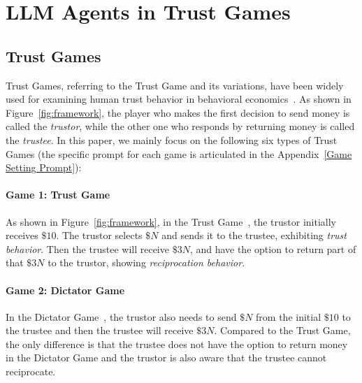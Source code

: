 \vspace{-0.4cm}
\section{LLM Agents in Trust Games}
\vspace{-0.15cm}


\subsection{Trust Games}


Trust Games, referring to the Trust Game and its variations, have been widely used for examining human trust behavior in behavioral economics~\citep{berg1995trust,lentonIncentivisingTrust2011,Measuring_Trust,cesariniHeritabilityCooperativeBehavior2008}.
As shown in Figure~\ref{fig:framework}, the player who makes the first decision to send money is called the \textit{trustor}, while the other one who responds by returning money is called the \textit{trustee}. 
In this paper, we mainly focus on the following six types of Trust Games (the specific prompt for each game is articulated in the Appendix~\ref{Game Setting Prompt}):









\vspace{-3mm}
\paragraph{Game 1: Trust Game}
\label{game:Trustee trust rate Game}

 As shown in Figure~\ref{fig:framework}, in the Trust Game~\citep{coxHowIdentifyTrust2004b,berg1995trust}, the trustor initially receives $\$10$. The trustor selects $\$N$ and sends it to the trustee, exhibiting  \textit{trust behavior}. Then the trustee will receive $\$3N$, and have the option to return part of that $\$3N$ to the trustor, showing \textit{reciprocation behavior}. 

\vspace{-3mm}
\paragraph{Game 2: Dictator Game}
\label{game:Dictator Game and trust game}
In the Dictator Game~\citep{coxHowIdentifyTrust2004b}, the trustor also needs to send $\$N$  from the initial $\$10$ to the trustee and then the trustee will receive $\$3N$. Compared to the Trust Game, the only difference is that the trustee does not have the option to return money in the Dictator Game and the trustor is also aware that the trustee cannot reciprocate.


